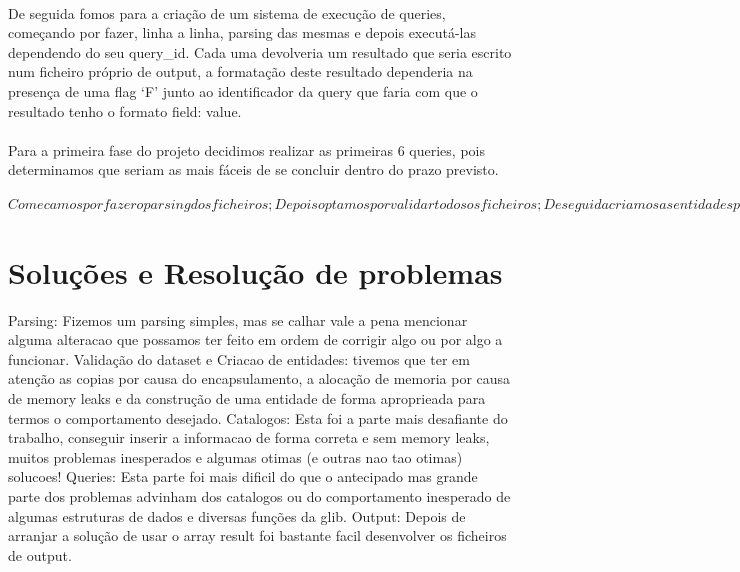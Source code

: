 \documentclass{article}
\begin{document}
\paragraph{}De seguida fomos para a criação de um sistema de execução de queries, começando por fazer, linha a linha, parsing das mesmas e depois executá-las dependendo do seu query\_id. Cada uma devolveria um resultado que seria escrito num ficheiro próprio de output, a formatação deste resultado dependeria na presença de uma flag ‘F’ junto ao identificador da query que faria com que o resultado tenho o formato field: value. 
\paragraph{}Para a primeira fase do projeto decidimos realizar as primeiras 6 queries, pois determinamos que seriam as mais fáceis de se concluir dentro do prazo previsto. 

$Comecamos por fazer o parsing dos ficheiros;
Depois optamos por validar todos os ficheiros;
De seguida criamos as entidades para representar a informação analisada;
Depois criamos a primeira versao dos nossos catalogos para armazenar as entidades com toda a informação guardada e processada;
Através dos catalogos desenvolvemos as \textit{queries} (consultas), para isto foi necessario fazer algumas alteracoes nos catalogos bem como adicionar outras estruturas de dados; 
Para finalizar esta fase tivemos apenas que definir um modulo para imprimir os resultados das \textit{queries} da forma pretendida, um ficheiro de output para cada linha do ficheiro input, correspondente a um comando, como visto anteriormente.$

\section{Soluções e Resolução de problemas}
Parsing: Fizemos um parsing simples, mas se calhar vale a pena mencionar alguma alteracao que possamos ter feito em ordem de corrigir algo ou por algo a funcionar.
Validação do dataset e Criacao de entidades: tivemos que ter em atenção as copias por causa do encapsulamento, a alocação de memoria por causa de memory leaks e da construção de uma entidade de forma aproprieada para termos o comportamento desejado.
Catalogos: Esta foi a parte mais desafiante do trabalho, conseguir inserir a informacao de forma correta e sem memory leaks, muitos problemas inesperados e algumas otimas (e outras nao tao otimas) solucoes!
Queries: Esta parte foi mais dificil do que o antecipado mas grande parte dos problemas advinham dos catalogos ou do comportamento inesperado de algumas estruturas de dados e diversas funções da glib. 
Output: Depois de arranjar a solução de usar o array result foi bastante facil desenvolver os ficheiros de output. 
\end{document}
